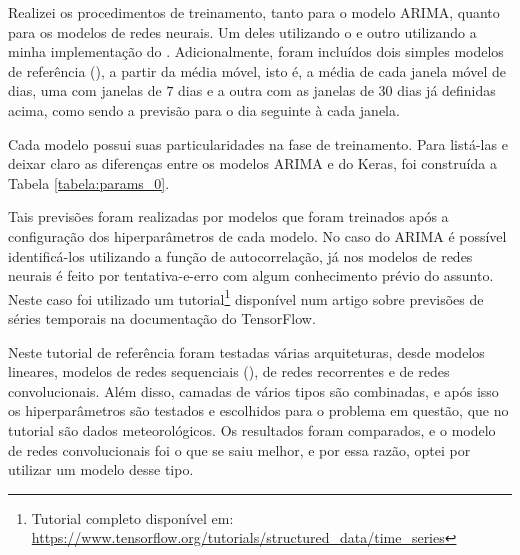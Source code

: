 Realizei os procedimentos de treinamento, tanto para o modelo ARIMA, quanto para os modelos de redes neurais. Um deles utilizando o  e outro utilizando a minha implementação do . Adicionalmente, foram incluídos dois simples modelos de referência (), a partir da média móvel, isto é, a média de cada janela móvel de dias, uma com janelas de $7$ dias e a outra com as janelas de $30$ dias já definidas acima, como sendo a previsão para o dia seguinte à cada janela.

Cada modelo possui suas particularidades na fase de treinamento. Para listá-las e deixar claro as diferenças entre os modelos ARIMA e do Keras, foi construída a Tabela \ref{tabela:params_0}.

\begin{table}[]
\begin{center}
\caption{Especificação dos dados de treino e de teste ($7$ dias).}\label{tabela:params_0}
\end{center}
\end{table}

Tais previsões foram realizadas por modelos que foram treinados após a configuração dos hiperparâmetros de cada modelo. No caso do ARIMA é possível identificá-los utilizando a função de autocorrelação, já nos modelos de redes neurais é feito por tentativa-e-erro com algum conhecimento prévio do assunto. Neste caso foi utilizado um tutorial\footnote{Tutorial completo disponível em: \url{https://www.tensorflow.org/tutorials/structured_data/time_series}} disponível num artigo sobre previsões de séries temporais na documentação do TensorFlow.

Neste tutorial de referência foram testadas várias arquiteturas, desde modelos lineares, modelos de redes sequenciais (), de redes recorrentes e de redes convolucionais. Além disso, camadas de vários tipos são combinadas, e após isso os hiperparâmetros são testados e escolhidos para o problema em questão, que no tutorial são dados meteorológicos. Os resultados foram comparados, e o modelo de redes convolucionais foi o que se saiu melhor, e por essa razão, optei por utilizar um modelo desse tipo.

